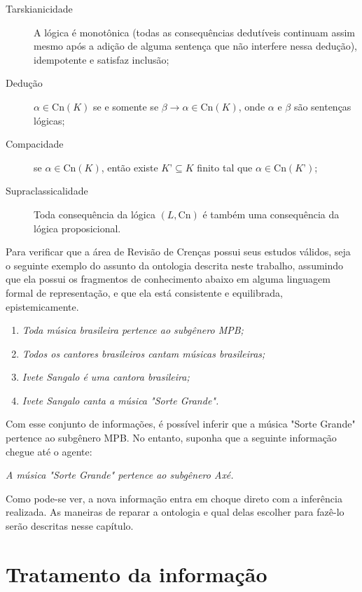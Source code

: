\begin{description}
	\item[Tarskianicidade] A lógica é monotônica (todas as consequências dedutíveis continuam assim mesmo após a adição de alguma sentença que não interfere nessa dedução), idempotente e satisfaz inclusão;
	\item[Dedução] $ \alpha \in \text{Cn}(K) $ se e somente se $ \beta \to \alpha \in \text{Cn}(K) $, onde $ \alpha $ e $ \beta $ são sentenças lógicas;
	\item[Compacidade] se $ \alpha \in \text{Cn}(K) $, então existe $ K’ \subseteq K $ finito tal que $ \alpha \in \text{Cn}(K’) $;
	\item[Supraclassicalidade] Toda consequência da lógica $ (L, \text{Cn}) $ é também uma consequência da lógica proposicional.
\end{description} 


Para verificar que a área de Revisão de Crenças possui seus estudos válidos, seja o seguinte exemplo do assunto da ontologia descrita neste trabalho, assumindo que ela possui os fragmentos de conhecimento abaixo em alguma linguagem formal de representação, e que ela está consistente e equilibrada, epistemicamente.

\begin{enumerate}
	\item \textit{Toda música brasileira pertence ao subgênero MPB;}
	\item \textit{Todos os cantores brasileiros cantam músicas brasileiras;}
	\item \textit{Ivete Sangalo é uma cantora brasileira;}
	\item \textit{Ivete Sangalo canta a música "Sorte Grande".}
\end{enumerate}

Com esse conjunto de informações, é possível inferir que a música "Sorte Grande" pertence ao subgênero MPB. No entanto, suponha que a seguinte informação chegue até o agente:

\begin{center}
	\textit{A música "Sorte Grande" pertence ao subgênero Axé.}
\end{center}

Como pode-se ver, a nova informação entra em choque direto com a inferência realizada. As maneiras de reparar a ontologia e qual delas escolher para fazê-lo serão descritas nesse capítulo.

\section{Tratamento da informação}

